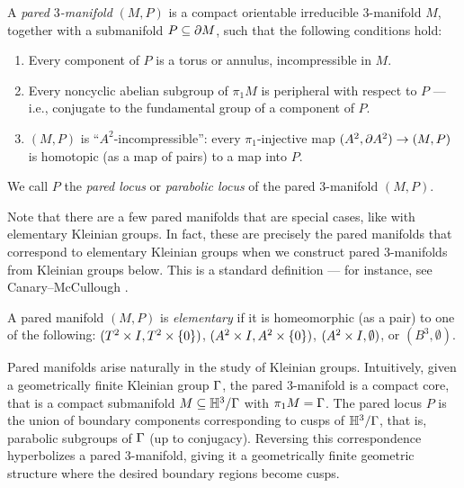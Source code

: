 \begin{defn}

A \emph{pared $3$-manifold} $(M,P)$ is a compact orientable irreducible
$3$-manifold $M$, together with a submanifold $P\subseteq\partial M$, such that the
following conditions hold:

\begin{enumerate}
\item Every component of $P$ is a torus or annulus, incompressible in $M$.

\item Every noncyclic abelian subgroup of $\pi_1M$ is peripheral with respect
to $P$ --- i.e., conjugate to the fundamental group of a component of $P$.

\item $(M,P)$ is ``$A^2$-incompressible'': every $\pi_1$-injective map $(A^2,
\partial A^2) \to (M,P)$ is homotopic (as a map of pairs) to a map into $P$.

\end{enumerate}

We call $P$ the \emph{pared locus} or \emph{parabolic locus} of the pared
$3$-manifold $(M,P)$.

\end{defn}

Note that there are a few pared manifolds that are special cases, like with
elementary Kleinian groups. In fact, these are precisely the pared manifolds
that correspond to elementary Kleinian groups when we construct pared
$3$-manifolds from Kleinian groups below. This is a standard definition --- for
instance, see Canary--McCullough \cite[pp88]{CMc}.

\begin{defn}

A pared manifold $(M,P)$ is \emph{elementary} if it is homeomorphic (as a pair)
to one of the following: $(T^2\times I,T^2\times \{0\})$, $(A^2\times I,A^2\times \{0\})$,
$(A^2\times I,\emptyset)$, or $(B^3,\emptyset)$.

\end{defn}

Pared manifolds arise naturally in the study of Kleinian groups. Intuitively,
given a geometrically finite Kleinian group $\Gamma$, the pared $3$-manifold is
a compact core, that is a compact submanifold $M \subseteq \mathbb{H}^3/\Gamma$ with $\pi_1M
= \Gamma$.  The pared locus $P$ is the union of boundary components corresponding
to cusps of $\mathbb{H}^3/\Gamma$, that is, parabolic subgroups of $\Gamma$ (up to
conjugacy).  Reversing this correspondence hyperbolizes a pared $3$-manifold,
giving it a geometrically finite geometric structure where the desired boundary
regions become cusps.

